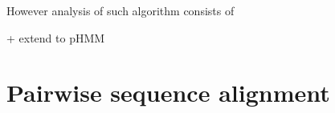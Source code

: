 However analysis of such algorithm consists of 

+ extend to pHMM





\section{Pairwise sequence alignment}


\label{LastPage}
